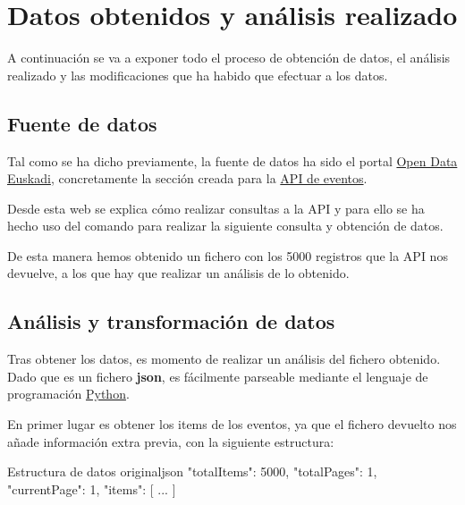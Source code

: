 \documentclass{\ClassPath/viu-tfm-template}
\begin{document}
\chapter{Datos obtenidos y análisis realizado}

A continuación se va a exponer todo el proceso de obtención de datos, el análisis realizado y las modificaciones que ha habido que efectuar a los datos.

\section{Fuente de datos}
Tal como se ha dicho previamente, la fuente de datos ha sido el portal \href{https://www.opendata.euskadi.eus/inicio/}{Open Data Euskadi}, concretamente la sección creada para la \href{https://www.opendata.euskadi.eus/api-culture/?api=culture_events}{API de eventos}.

Desde esta web se explica cómo realizar consultas a la API y para ello se ha hecho uso del comando  para realizar la siguiente consulta y obtención de datos.


De esta manera hemos obtenido un fichero  con los 5000 registros que la API nos devuelve, a los que hay que realizar un análisis de lo obtenido.


\section{Análisis y transformación de datos}
Tras obtener los datos, es momento de realizar un análisis del fichero obtenido. Dado que es un fichero \textbf{json}, es fácilmente parseable mediante el lenguaje de programación \href{URLhttps://www.python.org/}{Python}.

En primer lugar es obtener los items de los eventos, ya que el fichero devuelto nos añade información extra previa, con la siguiente estructura:

\begin{mycode}{Estructura de datos original}{json}{}
{
    "totalItems": 5000,
    "totalPages": 1,
    "currentPage": 1,
    "items": [
    {
        ...
    }]
}
\end{mycode}
\end{document}
